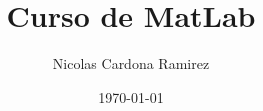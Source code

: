 \documentclass{article}
\date{\today}
\author{Nicolas Cardona Ramirez}
\begin{document}
	
	\title{Curso de MatLab}
	\maketitle
	
	
	
\end{document}

